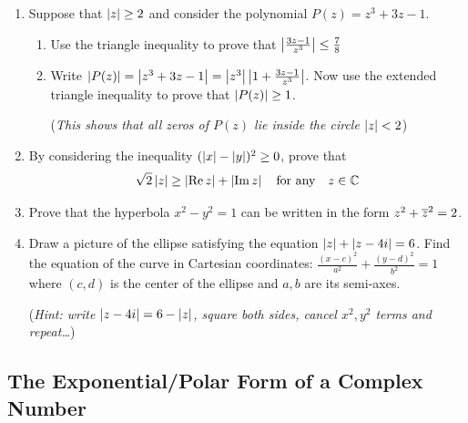 \begin{exercises}
\begin{enumerate}
	  \item Suppose that $\left| z\right|\ge 2$ and consider the polynomial $P(z)=z^3+3z-1$.
	  \begin{enumerate}
	    \item Use the triangle inequality to prove that $\left| \frac{3z-1}{z^3}\right|\le\frac 78$
	    \item Write $\left| P(z)\right|=\left| z^3+3z-1\right|=\left| z^3\right|\left| 1+\frac{3z-1}{z^3}\right|$. Now use the extended triangle inequality to prove that $\left| P(z)\right|\ge 1$.\par
	    (\emph{This shows that all zeros of $P(z)$ lie inside the circle $\left| z\right|<2$})
		\end{enumerate}
		
	 	\item By considering the inequality $(\left| x\right|-\left| y\right|)^2\ge 0$, prove that
	 	\[
	 		\sqrt 2\left| z\right|\ge \left| \operatorname{Re} z\right|+\left| \operatorname{Im} z\right| \quad\text{for any}\quad z\in\mathbb{C}
	 	\]
	 	
	 	\item Prove that the hyperbola $x^2-y^2=1$ can be written in the form $z^2+\overline{z}^2=2$.
	 	 
	  \item Draw a picture of the ellipse satisfying the equation $\left| z\right|+\left| z-4i\right|=6$. Find the equation of the curve in Cartesian coordinates: $\frac{(x-c)^2}{a^2}+\frac{(y-d)^2}{b^2}=1$ where $(c,d)$ is the center of the ellipse and $a,b$ are its semi-axes.\par
	  (\emph{Hint: write $\left| z-4i\right|=6-\left| z\right|$, square both sides, cancel $x^2,y^2$ terms and repeat\ldots})
	\end{enumerate}
\end{exercises}


\clearpage



\subsection[The Polar Form]{The Exponential/Polar Form of a Complex Number}


